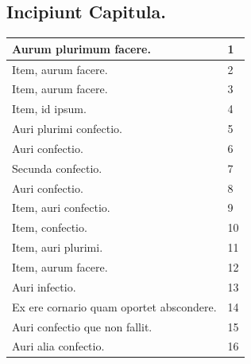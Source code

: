 \documentclass[a4paper, 11pt, oneside, polutonikogreek, italian]{article}
\begin{document}
\subsection*{Incipiunt Capitula.}
\begin{center}
    \footnotesize
    \begin{longtable}{|p{60mm}|l|}
    \hline
        Aurum plurimum facere.                                                          & 1 \\ \hline
         Item, aurum facere.                                                             & 2 \\ \hline
         Item, aurum facere.                                                             & 3 \\ \hline
         Item, id ipsum.                                                                 & 4 \\ \hline
         Auri plurimi confectio.                                                         & 5 \\ \hline
         Auri confectio.                                                                 & 6 \\ \hline
         Secunda confectio.                                                              & 7 \\ \hline
         Auri confectio.                                                                 & 8 \\ \hline
         Item, auri confectio.                                                           & 9 \\ \hline
         Item, confectio.                                                                & 10 \\ \hline
         Item, auri plurimi.                                                             & 11 \\ \hline
         Item, aurum facere.                                                             & 12 \\ \hline
         Auri infectio.                                                                  & 13 \\ \hline
         Ex ere cornario quam oportet abscondere.                                        & 14 \\ \hline
         Auri confectio que non fallit.                                                  & 15 \\ \hline
         Auri alia confectio.                                                            & 16 \\ \hline

\end{longtable}
\end{center}
\end{document}
